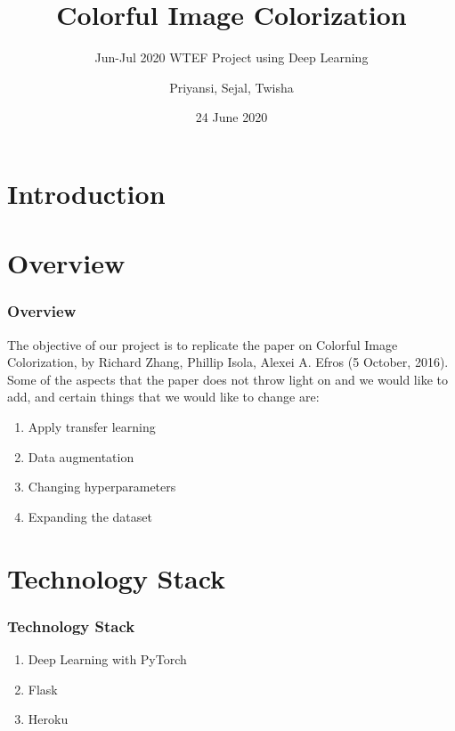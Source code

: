 \documentclass[16pt, subsection=false]{beamer}
\title{Colorful Image Colorization}
\subtitle{Jun-Jul 2020 WTEF Project using Deep Learning}
\author[Team 9]{Priyansi, Sejal, Twisha}
\date{24 June 2020}
\begin{document}
\section{Introduction}
\begin{frame}
	\titlepage
\end{frame}

\section{Overview}
\begin{frame}
	\frametitle{Overview}
	The objective of our project is to replicate the paper on Colorful Image Colorization, by Richard Zhang,
	Phillip Isola, Alexei A. Efros (5 October, 2016). \\
	Some of the aspects that the paper does not throw light on and we would like to add, and certain things that we
	would like to change are: \\
	\begin{enumerate}
		\item Apply transfer learning
		\item Data augmentation
		\item Changing hyperparameters
		\item Expanding the dataset
	\end{enumerate}
\end{frame}

\section{Technology Stack}
\begin{frame}
	\frametitle{Technology Stack}
	\begin{enumerate}
		\item Deep Learning with PyTorch \\
		\item Flask
		\item Heroku
	\end{enumerate}
\end{frame}
\end{document}
